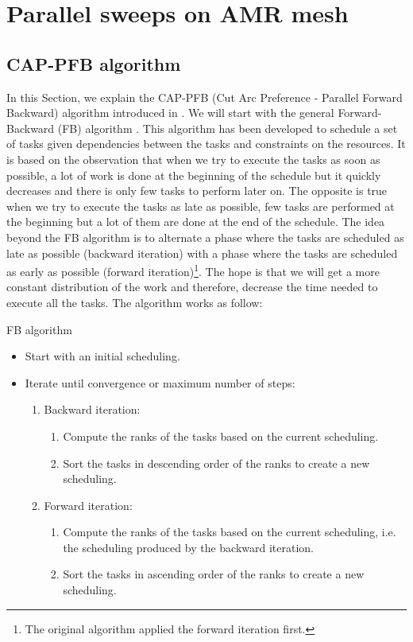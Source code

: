 \documentclass[letterpaper]{article}
\renewcommand{\(}{\left(}
\renewcommand{\)}{\right)}
\renewcommand{\[}{\left[}
\renewcommand{\]}{\right]}
\begin{document}
\section{Parallel sweeps on AMR mesh} \label{parallel_sweeps}

\subsection{CAP-PFB algorithm}
In this Section, we explain the CAP-PFB (Cut Arc Preference - Parallel Forward
Backward) algorithm introduced in \cite{Mo2014}. We will start with the general
Forward-Backward (FB) algorithm \cite{Li1992}. This algorithm has been developed
to schedule a set of tasks given dependencies between the tasks and constraints
on the resources. It is based on the observation that when we try to execute the
tasks as soon as possible, a lot of work is done at the beginning of the
schedule but it quickly decreases and there is only few tasks to perform later
on. The opposite is true when we try to execute the tasks as late as possible,
few tasks are performed at the beginning but a lot of them are done at the end
of the schedule. The idea beyond the FB algorithm is to alternate a phase where the
tasks are scheduled as late as possible (backward iteration) with a phase where the
tasks are scheduled as early as possible (forward iteration)\footnote{The
original algorithm applied the forward iteration first.}. The hope is
that we will get a more constant distribution of the work and therefore,
decrease the time needed to execute all the tasks. The algorithm works as
follow:
\begin{algorithm}[H]
  \caption{FB algorithm}
  \begin{itemize}
    \item Start with an initial scheduling.
    \item Iterate until convergence or maximum number of steps:
      \begin{enumerate}
        \item Backward iteration:
          \begin{enumerate}
            \item Compute the ranks of the tasks based on the current scheduling.
            \item Sort the tasks in descending order of the ranks to create a
              new scheduling.
          \end{enumerate}
        \item Forward iteration:
          \begin{enumerate}
            \item Compute the ranks of the tasks based on the current
              scheduling, i.e. the scheduling produced by the backward
              iteration.
            \item Sort the tasks in ascending order of the ranks to create a new
              scheduling.
          \end{enumerate}
      \end{enumerate}
  \end{itemize}
  \label{fb}
\end{algorithm}
\end{document}
